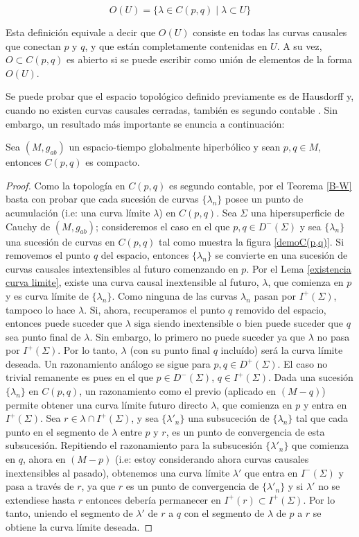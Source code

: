 \[ O(U)=\{\lambda\in C(p,q) \mid \lambda \subset U\} \]

Esta definición equivale a decir que $O(U)$ consiste en todas las curvas causales que conectan $p$ y $q$, y que están completamente contenidas en $U$. A su vez, $O\subset C(p,q)$ es abierto si se puede escribir como unión de elementos de la forma $O(U)$. 

Se puede probar que el espacio topológico definido previamente es de Hausdorff y, cuando no existen curvas causales cerradas, también es segundo contable \citep{1970JMP....11..437G}. Sin embargo, un resultado más importante se enuncia a continuación:

\begin{theorem}\label{C(p,q) compacto}
Sea $(M,g_{ab})$ un espacio-tiempo globalmente hiperbólico y sean $p, q\in M$, entonces $C(p,q)$ es compacto.
\end{theorem}
\begin{proof}
Como la topología en $C(p,q)$ es segundo contable, por el Teorema \ref{B-W} basta con probar que cada sucesión de curvas $\{\lambda_n\}$ posee un punto de acumulación (i.e: una curva límite $\lambda$) en $C(p,q)$. Sea $\Sigma$ una hipersuperficie de Cauchy de $(M,g_{ab})$; consideremos el caso en el que $p,q\in D^-(\Sigma)$ y sea $\{\lambda_n\}$ una sucesión de curvas en $C(p,q)$ tal como muestra la figura \ref{demoC(p,q)}. Si removemos el punto $q$ del espacio, entonces $\{\lambda_n\}$ se convierte en una sucesión de curvas causales intextensibles al futuro comenzando en $p$. Por el Lema \ref{existencia curva limite}, existe una curva causal inextensible al futuro, $\lambda$, que comienza en $p$ y es curva límite de $\{\lambda_n\}$. Como ninguna de las curvas $\lambda_n$ pasan por $I^+(\Sigma)$, tampoco lo hace $\lambda$. Si, ahora, recuperamos el punto $q$ removido del espacio, entonces puede suceder que $\lambda$ siga siendo inextensible o bien puede suceder que $q$ sea punto final de $\lambda$. Sin embargo, lo primero no puede suceder ya que $\lambda$ no pasa por $I^+(\Sigma)$. Por lo tanto, $\lambda$ (con su punto final $q$ incluído) será la curva límite deseada. Un razonamiento análogo se sigue para $p,q\in D^+(\Sigma)$. El caso no trivial remanente es pues en el que $p\in D^-(\Sigma)$, $q\in I^+(\Sigma)$. Dada una sucesión $\{\lambda_n\}$ en $C(p,q)$, un razonamiento como el previo (aplicado en $(M-q)$) permite obtener una curva límite futuro directo $\lambda$, que comienza en $p$ y entra en $I^+(\Sigma)$. Sea $r\in \lambda \cap I^+(\Sigma)$, y sea $\{\lambda'_n\}$ una subsuceción de $\{\lambda_n\}$ tal que cada punto en el segmento de $\lambda$ entre $p$ y $r$, es un punto de convergencia de esta subsucesión. Repitiendo el razonamiento para la subsucesión $\{\lambda'_n\}$ que comienza en $q$,  ahora en $(M-p)$ (i.e: estoy considerando ahora curvas causales inextensibles al pasado), obtenemos una curva límite $\lambda'$ que entra en $I^-(\Sigma)$ y pasa a través de $r$, ya que $r$ es un punto de convergencia de $\{\lambda'_n\}$ y si $\lambda'$ no se extendiese hasta $r$ entonces debería permanecer en $I^+(r)\subset I^+(\Sigma)$. Por lo tanto, uniendo el segmento de $\lambda'$ de $r$ a $q$ con el segmento de $\lambda$ de $p$ a $r$ se obtiene la curva límite deseada.
\end{proof}

